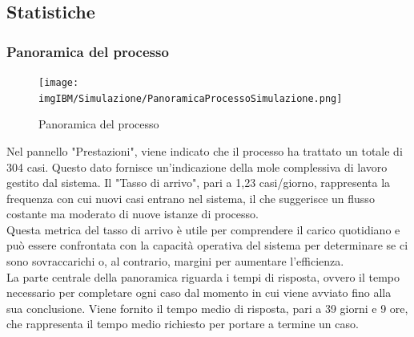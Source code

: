 \documentclass{article}
\begin{document}
\subsection{Statistiche}
\subsubsection{Panoramica del processo}
 \begin{figure}[H]
    \centering
    \texttt{[image: imgIBM/Simulazione/PanoramicaProcessoSimulazione.png]}
    \caption{Panoramica del processo}
    \label{fig:process-overview}
\end{figure}
Nel pannello "Prestazioni", viene indicato che il processo ha trattato un totale di 304 casi. Questo dato fornisce un'indicazione della mole complessiva di lavoro gestito dal sistema. Il "Tasso di arrivo", pari a 1,23 casi/giorno, rappresenta la frequenza con cui nuovi casi entrano nel sistema, il che suggerisce un flusso costante ma moderato di nuove istanze di processo.\\
Questa metrica del tasso di arrivo è utile per comprendere il carico quotidiano e può essere confrontata con la capacità operativa del sistema per determinare se ci sono sovraccarichi o, al contrario, margini per aumentare l'efficienza.\\
La parte centrale della panoramica riguarda i tempi di risposta, ovvero il tempo necessario per completare ogni caso dal momento in cui viene avviato fino alla sua conclusione. Viene fornito il tempo medio di risposta, pari a 39 giorni e 9 ore, che rappresenta il tempo medio richiesto per portare a termine un caso.\\
\end{document}

